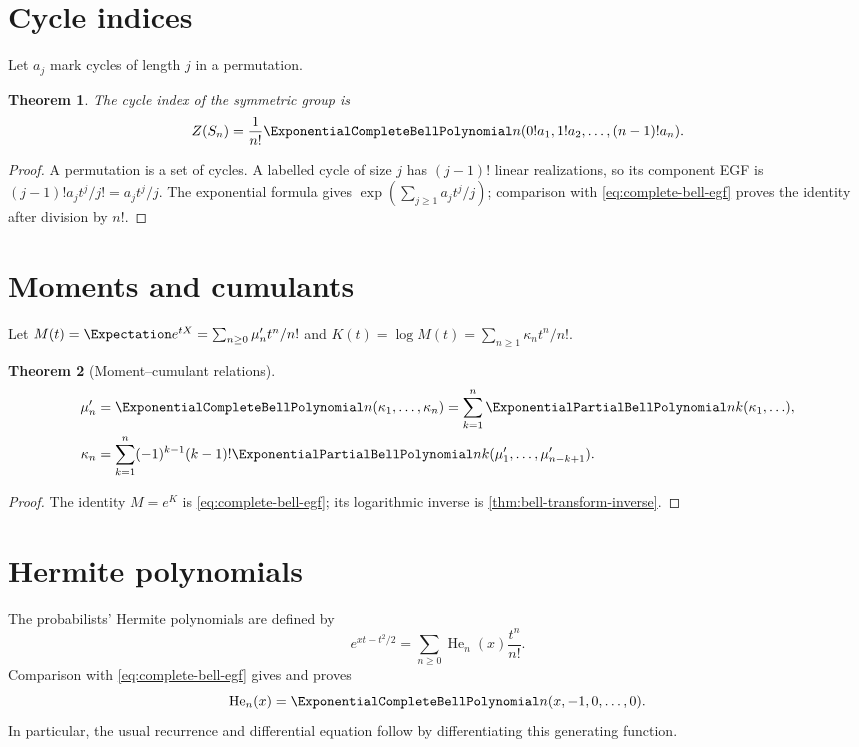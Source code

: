 \documentclass[11pt,a4paper,oneside,openany]{book}
\newtheorem{theorem}{Theorem}[chapter]
\theoremstyle{definition}
\theoremstyle{remark}
\begin{document}
\section{Cycle indices}
Let $a_j$ mark cycles of length $j$ in a permutation.
\begin{theorem}\label{thm:cycle-index-bell}
The cycle index of the symmetric group is
\begin{equation}\label{eq:cycle-index-bell}
 Z(S_n)=\frac1{n!}\ExponentialCompleteBellPolynomial n(0!a_1,1!a_2,\ldots,(n-1)!a_n).
\end{equation}
\end{theorem}
\begin{proof}
A permutation is a set of cycles.  A labelled cycle of size $j$ has $(j-1)!$
linear realizations, so its component EGF is $(j-1)!a_jt^j/j!=a_jt^j/j$.
The exponential formula gives
$\exp(\sum_{j\ge1}a_jt^j/j)$; comparison with
\eqref{eq:complete-bell-egf} proves the identity after division by $n!$.
\end{proof}

\section{Moments and cumulants}
Let $M(t)=\Expectation e^{tX}=\sum_{n\ge0}\mu'_nt^n/n!$ and
$K(t)=\log M(t)=\sum_{n\ge1}\kappa_nt^n/n!$.
\begin{theorem}[Moment--cumulant relations]\label{thm:moment-cumulant}
\begin{align}
 \mu'_n&=\ExponentialCompleteBellPolynomial n(\kappa_1,\ldots,\kappa_n)
 =\sum_{k=1}^{n}\ExponentialPartialBellPolynomial nk(\kappa_1,\ldots),
 \label{eq:moments-from-cumulants}\\
 \kappa_n&=\sum_{k=1}^{n}(-1)^{k-1}(k-1)!
 \ExponentialPartialBellPolynomial nk(\mu'_1,\ldots,\mu'_{n-k+1}).
 \label{eq:cumulants-from-moments}
\end{align}
\end{theorem}
\begin{proof}
The identity $M=e^K$ is \eqref{eq:complete-bell-egf}; its logarithmic inverse is
\cref{thm:bell-transform-inverse}.
\end{proof}

\section{Hermite polynomials}
The probabilists' Hermite polynomials are defined by
\[
 e^{xt-t^2/2}=\sum_{n\ge0}\operatorname{He}_n(x)\frac{t^n}{n!}.
\]
Comparison with \eqref{eq:complete-bell-egf} gives and proves
\begin{equation}\label{eq:hermite-bell}
 \operatorname{He}_n(x)=\ExponentialCompleteBellPolynomial n(x,-1,0,\ldots,0).
\end{equation}
In particular, the usual recurrence and differential equation follow by
differentiating this generating function.
\end{document}
